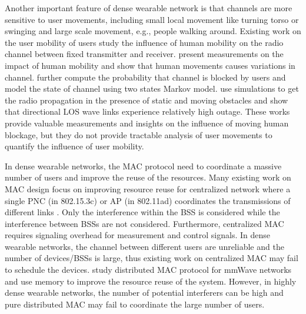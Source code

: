 \documentclass[10pt, conference, letterpaper]{IEEEtran}
\begin{document}
Another important feature of dense wearable network is that channels are more sensitive to user movements, including small local movement like turning torso or swinging and large scale movement, e.g., people walking around. Existing work on the user mobility of users \cite{humanactivity}\cite{blockagein60ghz}\cite{timevaryingpathshadowing} study the influence of human mobility on the radio channel between fixed transmitter and receiver. \cite{humanactivity}\cite{timevaryingpathshadowing} present measurements on the impact of human mobility and show that human movements causes variations in channel. \cite{timevaryingpathshadowing} further compute the probability that channel is blocked by users and model the state of channel using two states Markov model. 
\cite{blockagein60ghz} use simulations to get the radio propagation in the presence of static and moving obstacles and show that directional LOS wave links experience relatively high outage. These works provide valuable measurements and insights on the influence of moving human blockage, but they do not provide tractable analysis of user movements to quantify the influence of user mobility.

In dense wearable networks, the MAC protocol need to coordinate a massive number of users and improve the reuse of the resources. Many existing work on MAC design focus on improving resource reuse for centralized network where a single PNC (in 802.15.3c) or AP (in 802.11ad) coordinates the transmissions of different links \cite{virtualtimeslot}\cite{rex}\cite{fdmac}. Only the interference within the BSS is considered while the interference between BSSs are not considered. Furthermore, centralized MAC requires signaling overhead for measurement and control signals. In dense wearable networks, the channel between different users are unreliable and the number of devices/BSSs is large, thus existing work on centralized MAC may fail to schedule the devices. \cite{dtdmac}\cite{mdmac} study distributed MAC protocol for mmWave networks and use memory to improve the resource reuse of the system. However, in highly dense wearable networks, the number of potential interferers can be high and pure distributed MAC may fail to coordinate the large number of users. 
\end{document}

